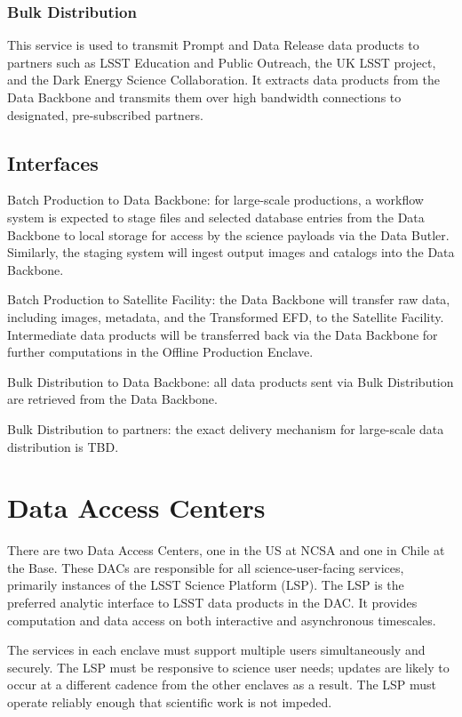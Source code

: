 \documentclass[DM,toc]{lsstdoc}
\begin{document}
\subsubsection{Bulk Distribution}\label{bulk-distribution}

This service is used to transmit Prompt and Data Release data products to partners such as LSST Education and Public Outreach, the UK LSST project, and the Dark Energy Science Collaboration.
It extracts data products from the Data Backbone and transmits them over high bandwidth connections to designated, pre-subscribed partners.


\subsection{Interfaces}\label{ncsa-general-production-interfaces}

Batch Production to Data Backbone: for large-scale productions, a workflow
system is expected to stage files and selected database entries from the
Data Backbone to local storage for access by the science payloads via
the Data Butler. Similarly, the staging system will ingest output images
and catalogs into the Data Backbone.

Batch Production to Satellite Facility: the Data Backbone will transfer raw data, including images, metadata, and the Transformed EFD, to the Satellite Facility.
Intermediate data products will be transferred back via the Data Backbone for further computations in the Offline Production Enclave.

Bulk Distribution to Data Backbone: all data products sent via Bulk Distribution are retrieved from the Data Backbone.

Bulk Distribution to partners: the exact delivery mechanism for
large-scale data distribution is TBD.


\section{Data Access Centers}\label{data-access-centers}

There are two Data Access Centers, one in the US at NCSA and one in
Chile at the Base. These DACs are responsible for all
science-user-facing services, primarily instances of the LSST Science
Platform (LSP). The LSP is the preferred analytic interface to LSST data
products in the DAC. It provides computation and data access on both
interactive and asynchronous timescales.

The services in each enclave must support multiple users simultaneously
and securely. The LSP must be responsive to science user needs; updates
are likely to occur at a different cadence from the other enclaves as a
result. The LSP must operate reliably enough that scientific work is not
impeded.
\end{document}
